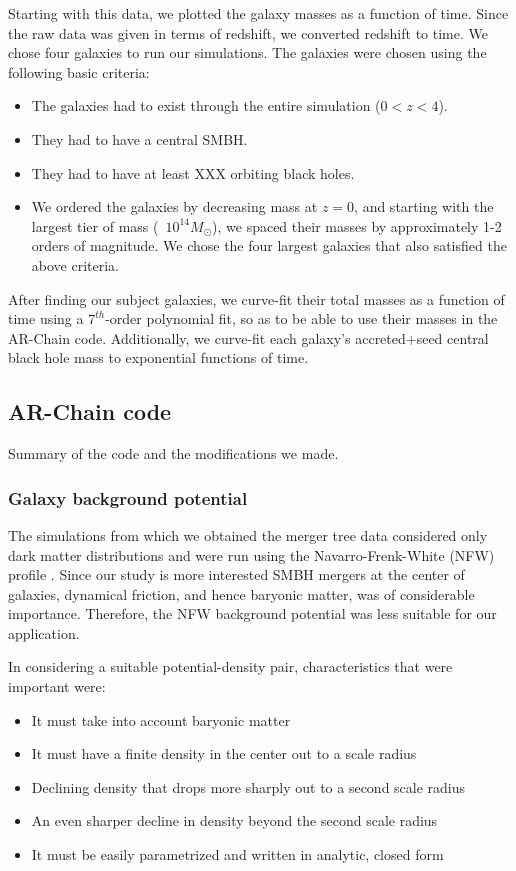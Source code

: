 \documentclass[english, apj]{emulateapj}
\begin{document}
Starting with this data, we plotted the galaxy masses as a function of time.  Since the raw data was given in terms of redshift, we converted redshift to time.  We chose four galaxies to run our simulations.  The galaxies were chosen using the following basic criteria:
\begin{itemize}
\item The galaxies had to exist through the entire simulation ($0 < z < 4$).
\item They had to have a central SMBH.
\item They had to have at least XXX orbiting black holes.
\item We ordered the galaxies by decreasing mass at $z=0$, and starting with the largest tier of mass (~$10^{14} M_{\odot}$), we spaced their masses by approximately 1-2 orders of magnitude.  We chose the four largest galaxies that also satisfied the above criteria.
\end{itemize}

After finding our subject galaxies, we curve-fit their total masses as a function of time using a $7^{th}$-order polynomial fit, so as to be able to use their masses in the AR-Chain code.  Additionally, we curve-fit each galaxy's accreted+seed central black hole mass to exponential functions of time.



\subsection{AR-Chain code}
Summary of the code and the modifications we made.



\subsubsection{Galaxy background potential}
The simulations from which we obtained the merger tree data considered only dark matter distributions and were run using the Navarro-Frenk-White (NFW) profile \citet{1997ApJ...490..493N}.  Since our study is more interested SMBH mergers at the center of galaxies, dynamical friction, and hence baryonic matter, was of considerable importance.  Therefore, the NFW background potential was less suitable for our application.

In considering a suitable potential-density pair, characteristics that were important were:
\begin{itemize}
\item It must take into account baryonic matter
\item It must have a finite density in the center out to a scale radius
\item Declining density that drops more sharply out to a second scale radius
\item An even sharper decline in density beyond the second scale radius
\item It must be easily parametrized and written in analytic, closed form
\end{itemize}
\end{document}
